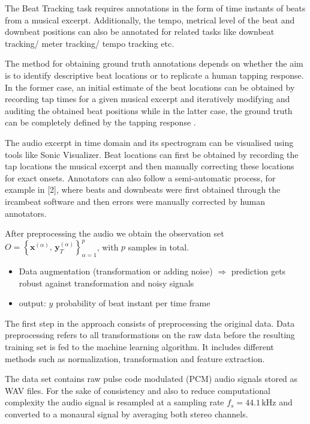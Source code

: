 \documentclass{scrartcl}
\begin{document}

The Beat Tracking task requires annotations in the form of time instants of beats from a musical excerpt. Additionally, the tempo, metrical level of the beat and downbeat positions can also be annotated for related tasks like downbeat tracking/ meter tracking/ tempo tracking etc.

The method for obtaining ground truth annotations depends on whether the aim is to identify descriptive beat locations or to replicate a human tapping response. In the former case, an initial estimate of the beat locations can be obtained by recording tap times for a given musical excerpt and iteratively modifying and auditing the obtained beat positions while in the latter case, the ground truth can be completely defined by the tapping response \cite{Davies2009b}.

The audio excerpt in time domain and its spectrogram can be visualised using tools like Sonic Visualizer. Beat locations can first be obtained by recording the tap locations the musical excerpt and then manually correcting these locations for exact onsets.  Annotators can also follow a semi-automatic process, for example in [2], where beats and downbeats were first obtained through the ircambeat software and then errors were manually corrected by human annotators.

After preprocessing the audio we obtain the observation set $ O = \left\{ \mathbf x^{(\alpha)}, \,\mathbf y_T^{(\alpha)} \right \}_{\alpha = 1}^p$, with $p$ samples in total. 

\begin{itemize}
\item Data augmentation (transformation or adding noise) $\Rightarrow$ prediction gets robust against transformation and noisy signals
\item output: $y$ probability of beat instant per time frame 
\end{itemize}



The first step in the approach consists of preprocessing the original data. Data preprocessing refers to all transformations on the raw data before the resulting training set is fed to the machine learning algorithm. It includes different methods such as normalization, transformation and feature extraction. 

The data set contains raw pulse code modulated (PCM) audio signals stored as WAV files. For the sake of consistency and also to reduce computational complexity the audio signal is resampled at a sampling rate $f_s = 44.1 \,\text{kHz}$ and converted to a monaural signal by averaging both stereo channels. 
\end{document}
